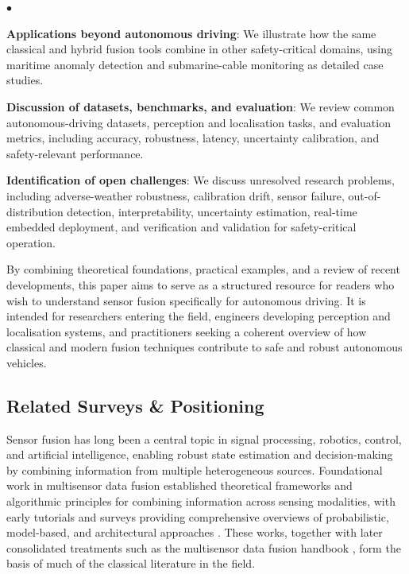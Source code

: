 \documentclass{ieeeaccess}
\newenvironment{list4a}{
  \begin{list}{$\bullet$}{%
      \setlength{\itemsep}{0.05cm}
      \setlength{\labelsep}{0.2cm}
      \setlength{\labelwidth}{0.3cm}
      \setlength{\parsep}{0in}
      \setlength{\parskip}{0in}
      \setlength{\topsep}{0in}
      \setlength{\partopsep}{0in}
      \setlength{\leftmargin}{0.16in}}}
      {\end{list}}
\begin{document}
\begin{list4a}
    \item \textbf{Applications beyond autonomous driving}: We illustrate how the same classical and hybrid fusion tools combine in other safety-critical domains, using maritime anomaly detection and submarine-cable monitoring as detailed case studies.
    \item \textbf{Discussion of datasets, benchmarks, and evaluation}: We review common autonomous-driving datasets, perception and localisation tasks, and evaluation metrics, including accuracy, robustness, latency, uncertainty calibration, and safety-relevant performance.
    \item \textbf{Identification of open challenges}: We discuss unresolved research problems, including adverse-weather robustness, calibration drift, sensor failure, out-of-distribution detection, interpretability, uncertainty estimation, real-time embedded deployment, and verification and validation for safety-critical operation.
\end{list4a}

By combining theoretical foundations, practical examples, and a review of recent developments, this paper aims to serve as a structured resource for readers who wish to understand sensor fusion specifically for autonomous driving. It is intended for researchers entering the field, engineers developing perception and localisation systems, and practitioners seeking a coherent overview of how classical and modern fusion techniques contribute to safe and robust autonomous vehicles.

\subsection{Related Surveys \& Positioning}
\label{subsec:related}

Sensor fusion has long been a central topic in signal processing, robotics, control, and artificial intelligence, enabling robust state estimation and decision-making by combining information from multiple heterogeneous sources. Foundational work in multisensor data fusion established theoretical frameworks and algorithmic principles for combining information across sensing modalities, with early tutorials and surveys providing comprehensive overviews of probabilistic, model-based, and architectural approaches \cite{hall_introduction_1997, luo_multisensor_1989}. These works, together with later consolidated treatments such as the multisensor data fusion handbook \cite{liggins_handbook_2009}, form the basis of much of the classical literature in the field.
\end{document}
